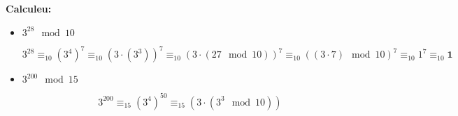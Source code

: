 \documentclass[a4paper]{article}
\begin{document}
\textbf{Calculeu:}

\begin{itemize}
	\item $3^{28} \mod 10$
	
	$$
	3^{28} \equiv_{10} (3^{4})^7 \equiv_{10} (3 \cdot (3^{3}))^7 \equiv_{10} 
	(3 \cdot (27 \mod 10))^7 \equiv_{10} ((3 \cdot 7) \mod 10)^{7} \equiv_{10} 1^7 \equiv_{10} \boldsymbol{1}
	$$
	
	\item $3^{200} \mod 15$
	
	$$
	3^{200} \equiv_{15} (3^4)^{50} \equiv_{15} (3 \cdot (3^3 \mod 10))
	$$
\end{itemize}
\end{document}
